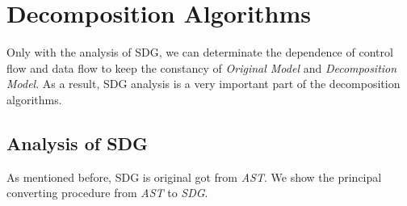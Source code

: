 \section{Decomposition Algorithms}
Only with the analysis of SDG, we can determinate the dependence of control flow and data flow to keep the constancy of \emph{Original Model} and \emph{Decomposition Model}. As a result, SDG analysis is a very important part of the decomposition algorithms.

\subsection{Analysis of SDG}
As mentioned before, SDG is original got from  \emph{AST}. We show the principal converting procedure from  \emph{AST} to \emph{SDG}.
%
%
%
%

